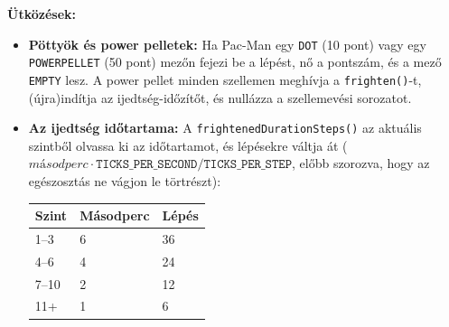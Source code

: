 \documentclass[11pt, a4paper]{article}
\begin{document}
\textbf{Ütközések:}
\begin{itemize}
    \item \textbf{Pöttyök és power pelletek:} Ha Pac-Man egy \texttt{DOT} (10 pont) vagy egy \texttt{POWERPELLET} (50 pont) mezőn fejezi be a lépést, nő a pontszám, és a mező \texttt{EMPTY} lesz. A power pellet minden szellemen meghívja a \texttt{frighten()}-t, (újra)indítja az ijedtség-időzítőt, és nullázza a szellemevési sorozatot.
    \item \textbf{Az ijedtség időtartama:} A \texttt{frightenedDurationSteps()} az aktuális szintből olvassa ki az időtartamot, és lépésekre váltja át ($\textit{másodperc} \cdot \texttt{TICKS\_PER\_SECOND} / \texttt{TICKS\_PER\_STEP}$, előbb szorozva, hogy az egészosztás ne vágjon le törtrészt):

    \vspace{0.1cm}
    \begin{tabular}{@{}lll@{}}
        \toprule
        \textbf{Szint} & \textbf{Másodperc} & \textbf{Lépés} \\
        \midrule
        1--3 & 6 & 36 \\
        4--6 & 4 & 24 \\
        7--10 & 2 & 12 \\
        11+ & 1 & 6 \\
        \bottomrule
    \end{tabular}
    \vspace{0.1cm}


\end{itemize}
\end{document}
